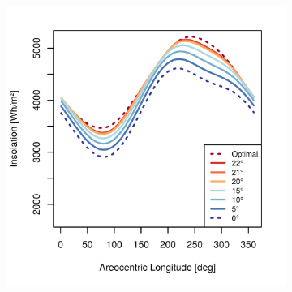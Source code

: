 \begin{figure}[h]
\vspace{-2ex}
\centering
    \setlength{\subfigureWidth}{0.50\textwidth}
    \setlength{\graphicsHeight}{60mm}
    \hypersetup{hidelinks=true}%
    \begin{subfigure}[t]{\subfigureWidth}
        \centering
            \includegraphics[height=\graphicsHeight]{sections/mars-solar-energy/mission-sites/plots/iani-chaos-solar-insolations-for-different-beta-inclinations.png}
            \label{fig:plot:sub:solar-insolations-for-different-beta-iani-chaos}
    \end{subfigure}\hfill
    \begin{subfigure}[t]{\subfigureWidth}
        \centering

\end{subfigure}
\end{figure}
